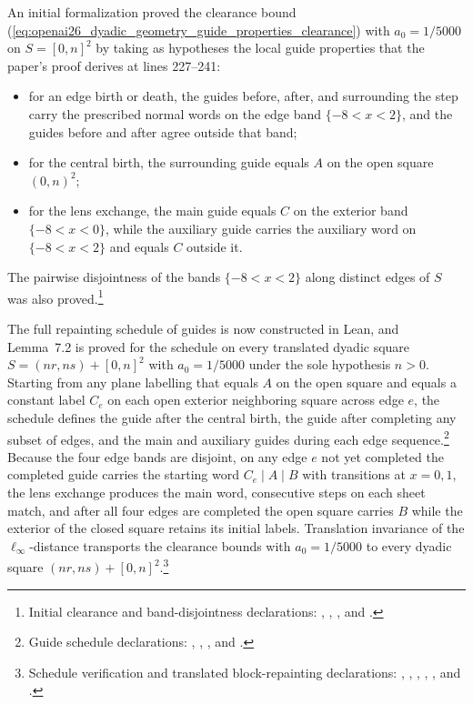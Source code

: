 \documentclass{article}
\begin{document}
An initial formalization proved the clearance bound
(\ref{eq:openai26_dyadic_geometry_guide_properties_clearance}) with
$a_0=1/5000$ on $S=[0,n]^2$ by taking as hypotheses the local guide properties
that the paper's proof derives at lines 227--241:
\begin{itemize}
    \item for an edge birth or death, the guides before, after, and surrounding
    the step carry the prescribed normal words on the edge band $\{-8<x<2\}$,
    and the guides before and after agree outside that band;
    \item for the central birth, the surrounding guide equals $A$ on the open
    square $(0,n)^2$;
    \item for the lens exchange, the main guide equals $C$ on the exterior band
    $\{-8<x<0\}$, while the auxiliary guide carries the auxiliary word on
    $\{-8<x<2\}$ and equals $C$ outside it.
\end{itemize}
The pairwise disjointness of the bands $\{-8<x<2\}$ along distinct edges of $S$
was also proved.\footnote{Initial clearance and band-disjointness declarations:
,
,
, and
.}

The full repainting schedule of guides is now constructed in Lean, and
Lemma~7.2 is proved for the schedule on every translated dyadic square
$S=(nr,ns)+[0,n]^2$ with $a_0=1/5000$ under the sole hypothesis $n>0$. Starting
from any plane labelling that equals $A$ on the open square and equals a
constant label $C_e$ on each open exterior neighboring square across edge $e$,
the schedule defines the guide after the central birth, the guide after
completing any subset of edges, and the main and auxiliary guides during each
edge sequence.\footnote{Guide schedule declarations:
,
,
, and
.}
Because the four edge bands are disjoint, on any edge $e$ not yet completed the
completed guide carries the starting word $C_e\mid A\mid B$ with transitions at
$x=0,1$, the lens exchange produces the main word, consecutive steps on each
sheet match, and after all four edges are completed the open square carries $B$
while the exterior of the closed square retains its initial labels. Translation
invariance of the $\ell_\infty$-distance transports the clearance bounds with
$a_0=1/5000$ to every dyadic square $(nr,ns)+[0,n]^2$.\footnote{Schedule
verification and translated block-repainting declarations:
,
,
,
,
, and
.}
\end{document}
